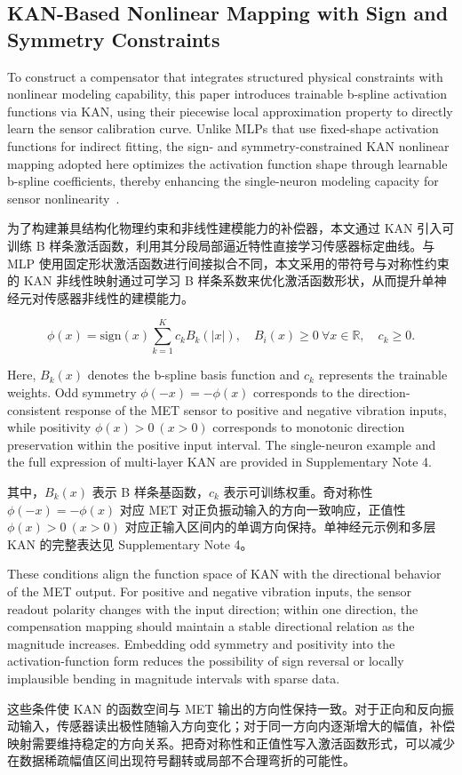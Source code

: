 \documentclass[sn-nature]{sn-jnl}
\newif\ifCNENEnglish
\newif\ifCNENBilingual
\newcommand{\CNEN}[2]{%
    \ifCNENBilingual
        #1%
        \if\relax\detokenize{#2}\relax\else\par #2\fi%
    \else
        \ifCNENEnglish
            #2%
        \else
            #1%
        \fi
    \fi
}
\begin{document}
\subsection{KAN-Based Nonlinear Mapping with Sign and Symmetry Constraints}

\CNEN{为了构建兼具结构化物理约束和非线性建模能力的补偿器，本文通过 KAN 引入可训练 B 样条激活函数，利用其分段局部逼近特性直接学习传感器标定曲线。与 MLP 使用固定形状激活函数进行间接拟合不同，本文采用的带符号与对称性约束的 KAN 非线性映射通过可学习 B 样条系数来优化激活函数形状，从而提升单神经元对传感器非线性的建模能力\cite{livierisCKANNewApproach2024}。}{To construct a compensator that integrates structured physical constraints with nonlinear modeling capability, this paper introduces trainable b-spline activation functions via KAN, using their piecewise local approximation property to directly learn the sensor calibration curve. Unlike MLPs that use fixed-shape activation functions for indirect fitting, the sign- and symmetry-constrained KAN nonlinear mapping adopted here optimizes the activation function shape through learnable b-spline coefficients, thereby enhancing the single-neuron modeling capacity for sensor nonlinearity~\cite{livierisCKANNewApproach2024}.%
}

\begin{equation}
    \phi(x) = \text{sign}(x) \sum_{k=1}^{K} c_k B_k(|x|), \quad B_i(x) \geq 0 \ \forall x \in \mathbb{R}, \quad c_k \geq 0.
    \label{fun:KAN_activation}
\end{equation}

\CNEN{其中，$B_k(x)$ 表示 B 样条基函数，$c_k$ 表示可训练权重。奇对称性 $\phi(-x)=-\phi(x)$ 对应 MET 对正负振动输入的方向一致响应，正值性 $\phi(x)>0\ (x>0)$ 对应正输入区间内的单调方向保持。单神经元示例和多层 KAN 的完整表达见 Supplementary Note 4。}{Here, $B_k(x)$ denotes the b-spline basis function and $c_k$ represents the trainable weights. Odd symmetry $\phi(-x)=-\phi(x)$ corresponds to the direction-consistent response of the MET sensor to positive and negative vibration inputs, while positivity $\phi(x)>0\ (x>0)$ corresponds to monotonic direction preservation within the positive input interval. The single-neuron example and the full expression of multi-layer KAN are provided in Supplementary Note 4.%
}

\CNEN{这些条件使 KAN 的函数空间与 MET 输出的方向性保持一致。对于正向和反向振动输入，传感器读出极性随输入方向变化；对于同一方向内逐渐增大的幅值，补偿映射需要维持稳定的方向关系。把奇对称性和正值性写入激活函数形式，可以减少在数据稀疏幅值区间出现符号翻转或局部不合理弯折的可能性。}{These conditions align the function space of KAN with the directional behavior of the MET output. For positive and negative vibration inputs, the sensor readout polarity changes with the input direction; within one direction, the compensation mapping should maintain a stable directional relation as the magnitude increases. Embedding odd symmetry and positivity into the activation-function form reduces the possibility of sign reversal or locally implausible bending in magnitude intervals with sparse data.}
\end{document}
